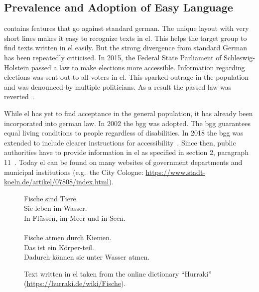 \subsection{Prevalence and Adoption of Easy Language}\label{subsec:el-adop}

 contains features that go against standard german.
The unique layout with very short lines makes it easy to recognize texts in \gls{el}.
This helps the target group to find texts written in \gls{el} easily.
But the strong divergence from standard German has been repeatedly criticised.
In 2015, the Federal State Parliament of Schleswig-Holstein passed a law to make elections more accessible.
Information regarding elections was sent out to all voters in \gls{el}.
This sparked outrage in the population and was denounced by multiple politicians.
As a result the passed law was reverted~\autocite{easyLanguageBook}.

While \gls{el} has yet to find acceptance in the general population, it has already been incorporated into german law.
In 2002 the \gls{bgg} was adopted.
The \gls{bgg} guarantees equal living conditions to people regardless of disabilities.
In 2018 the \gls{bgg} was extended to include clearer instructions for accessibility~\autocite{bggInfo}.
Since then, public authorities have to provide information in \gls{el} as specified in section 2, paragraph 11~\autocite{bgg2018}.
Today \gls{el} can be found on many websites of government departments and municipal institutions (e.g.\ the City Cologne: \url{https://www.stadt-koeln.de/artikel/07808/index.html}).

\begin{figure}
    \centering
    \colorbox{goodgreen!20}{
        \begin{minipage}{0.6\textwidth}
            Fische sind Tiere. \\
            Sie leben im Wasser. \\
            In Flüssen, im Meer und in Seen. \\
            \\
            Fische atmen durch Kiemen. \\
            Das ist ein Körper-teil. \\
            Dadurch können sie unter Wasser atmen.
        \end{minipage}
    }
    \caption[Text written in .]{Text written in \gls{el} taken from the online dictionary \enquote{Hurraki} (\url{https://hurraki.de/wiki/Fische}).}
    \label{fig:easy_text}
\end{figure}


